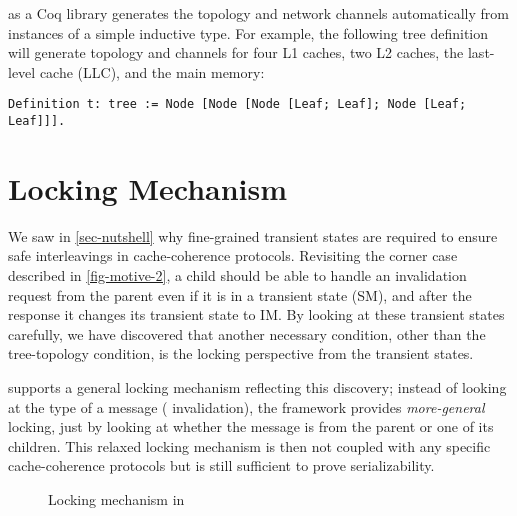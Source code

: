 \hemiola{} as a Coq library generates the topology and network channels automatically from instances of a simple inductive type.
For example, the following tree definition will generate topology and channels for four L1 caches, two L2 caches, the last-level cache (LLC), and the main memory:
\begin{lstlisting}[numbers=none, frame=none]
Definition t: tree := Node [Node [Node [Leaf; Leaf]; Node [Leaf; Leaf]]].
\end{lstlisting}

\section{Locking Mechanism}
\label{sec-locking-mechanism}

We saw in \autoref{sec-nutshell} why fine-grained transient states are required to ensure safe interleavings in cache-coherence protocols.
Revisiting the corner case described in \autoref{fig-motive-2}, a child should be able to handle an invalidation request from the parent even if it is in a transient state (SM), and after the response it changes its transient state to IM.
By looking at these transient states carefully, we have discovered that another necessary condition, other than the tree-topology condition, is the locking perspective from the transient states.

\hemiola{} supports a general locking mechanism reflecting this discovery;
instead of looking at the type of a message (\eg{} invalidation), the framework provides \emph{more-general} locking, just by looking at whether the message is from the parent or one of its children.
This relaxed locking mechanism is then not coupled with any specific cache-coherence protocols but is still sufficient to prove serializability.

\begin{figure}[h]
  \centering
  \caption{Locking mechanism in \hemiola{}}
  \label{fig-locking}
\end{figure}

